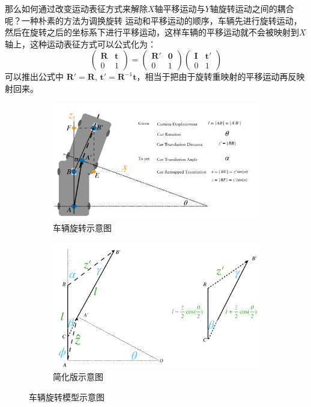 那么如何通过改变运动表征方式来解除$X$轴平移运动与$Y$轴旋转运动之间的耦合呢？一种朴素的方法为调换旋转
运动和平移运动的顺序，车辆先进行旋转运动，然后在旋转之后的坐标系下进行平移运动，这样车辆的平移运动就不会被映射到$X$轴上，这种运动表征方式可以公式化为：
\begin{equation}
    \begin{pmatrix} \mathbf{R} & \mathbf{t}\\ 0 & 1  \end{pmatrix} = \begin{pmatrix} \mathbf{R'}& \mathbf{0}\\ 0 & 1  \end{pmatrix}\begin{pmatrix} \mathbf{I}& \mathbf{t'}\\ 0 & 1  \end{pmatrix}
    \label{eq:frlt}
\end{equation}
可以推出公式中
$\mathbf{R'} = \mathbf{R}$, $\mathbf{t'} = \mathbf{R}^{-1}\mathbf{t}$，相当于把由于旋转重映射的平移运动再反映射回来。
\begin{figure}[ht]
    \centering
    \begin{subfigure}[b]{0.48\textwidth}
        \includegraphics[width=\textwidth]{datavo/vehicle_rotation_1-crop.pdf}
        \caption{车辆旋转示意图}
        \label{fig:vehicel_rotation_model} 
    \end{subfigure}
    \begin{subfigure}[b]{0.48\textwidth}
        \includegraphics[width=\textwidth]{datavo/vehicle_rotation_2-crop.pdf}
        \caption{简化版示意图}
        \label{fig:vehicel_rotation_model_s} 
    \end{subfigure}
    \caption{车辆旋转模型示意图}
    \label{fig:rotation_model}
\end{figure}
